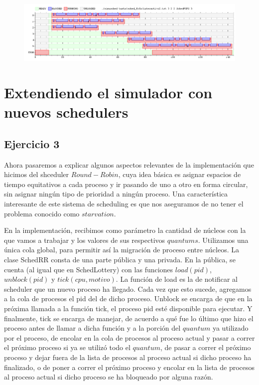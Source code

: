 \documentclass[11pt, a4paper, twoside]{article}
\begin{document}
\begin{figure}[H]
  \includegraphics [width=\textwidth]{../graficos/sched_fcfs/interactivo2_3.png}
  \caption{}
\end{figure}

\clearpage





\section{Extendiendo el simulador con nuevos schedulers}
\setcounter{subsection}{2}

\subsection{Ejercicio 3}
Ahora pasaremos a explicar algunos aspectos relevantes de la implementación que hicimos del shceduler
$Round-Robin$, cuya idea básica es asignar espacios de tiempo equitativos a cada proceso y ir pasando
de uno a otro en forma circular, sin asignar ningún tipo de prioridad a ningún proceso. Una
característica interesante de este sistema de scheduling es que nos aseguramos de no tener el problema
conocido como $starvation$. 

En la implementación, recibimos como parámetro la cantidad de núcleos con la que vamos a trabajar
y los valores de sus respectivos $quantums$. Utilizamos una única cola global, para permitir así la
migración de proceso entre núcleos. La clase SchedRR consta de una parte pública y una privada. En 
la pública, se cuenta (al igual que en SchedLottery) con las funciones $load(pid)$, $unblock(pid)$ 
y $tick(cpu, motivo)$. La función de load es la de notificar al scheduler que un nuevo proceso ha llegado.
Cada vez que esto sucede, agregamos a la cola de procesos el pid del de dicho proceso. Unblock se encarga 
de que en la próxima llamada a la función tick, el proceso pid esté disponible para ejecutar. Y 
finalmente, tick se encarga de manejar, de acuerdo a qué fue lo último que hizo el proceso antes de llamar
a dicha función y a la porción del $quantum$ ya utilizado por el proceso, de encolar en la cola de procesos
al proceso actual y pasar a correr el próximo proceso si ya se utilizó todo el $quantum$, de pasar a correr 
el próximo proceso y dejar fuera de la lista de procesos al proceso actual si dicho proceso ha finalizado, o de
poner a correr el próximo proceso y encolar en la lista de procesos al proceso actual si dicho proceso se ha
bloqueado por alguna razón. 
\end{document}

